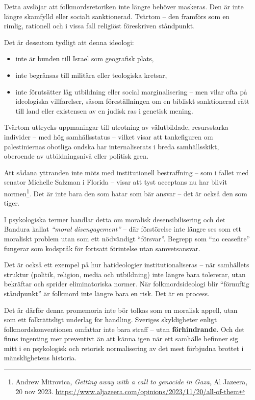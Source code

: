 Detta avslöjar att folkmordsretoriken inte längre behöver maskeras. Den är inte längre skamfylld eller socialt sanktionerad. Tvärtom – den framförs som en rimlig, rationell och i vissa fall religiöst föreskriven ståndpunkt.


Det är dessutom tydligt att denna ideologi:
\begin{itemize}
    \item inte är bunden till Israel som geografisk plats,
    \item inte begränsas till militära eller teologiska kretsar,
    \item inte förutsätter låg utbildning eller social marginalisering – men vilar ofta på ideologiska villfarelser, såsom föreställningen om en bibliskt sanktionerad rätt till land eller existensen av en judisk ras i genetisk mening.
\end{itemize}


Tvärtom uttrycks uppmaningar till utrotning av välutbildade, resursstarka individer – med hög samhällsstatus – vilket visar att tankefiguren om palestiniernas obotliga ondska har internaliserats i breda samhällsskikt, oberoende av utbildningsnivå eller politisk gren.

Att sådana yttranden inte möts med institutionell bestraffning – som i fallet med senator Michelle Salzman i Florida – visar att tyst acceptans nu har blivit normen\footnote{Andrew Mitrovica, \textit{Getting away with a call to genocide in Gaza}, Al Jazeera, 20 nov 2023. \url{https://www.aljazeera.com/opinions/2023/11/20/all-of-them}}. Det är inte bara den som hatar som bär ansvar – det är också den som tiger.

I psykologiska termer handlar detta om moralisk desensibilisering och det Bandura kallat \textit{“moral disengagement”} – där förstörelse inte längre ses som ett moraliskt problem utan som ett nödvändigt “försvar”. Begrepp som “no ceasefire” fungerar som kodspråk för fortsatt förintelse utan samvetsansvar.

Det är också ett exempel på hur hatideologier institutionaliseras – när samhällets struktur (politik, religion, media och utbildning) inte längre bara tolererar, utan bekräftar och sprider eliminatoriska normer. När folkmordsideologi blir “förnuftig ståndpunkt” är folkmord inte längre bara en risk. Det är en process.

Det är därför denna promemoria inte bör tolkas som en moralisk appell, utan som ett folkrättsligt underlag för handling. Sveriges skyldigheter enligt folkmordskonventionen omfattar inte bara straff – utan \textbf{förhindrande}. Och det finns ingenting mer preventivt än att känna igen när ett samhälle befinner sig mitt i en psykologisk och retorisk normalisering av det mest förbjudna brottet i mänsklighetens historia.


